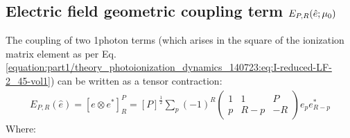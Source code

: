 \documentclass[letterpaper,table,10pt,english]{jupyterBook}
\begin{document}
\subsection{Electric field geometric coupling term \protect\({E_{P,R}(\hat{e};\mu_{0})}\protect\)}
\label{\detokenize{part1/theory_tensor_formalism_160723:electric-field-geometric-coupling-term-e-p-r-hat-e-mu-0}}\label{\detokenize{part1/theory_tensor_formalism_160723:sec-theory-epr-term}}
\sphinxAtStartPar
The coupling of two 1\sphinxhyphen{}photon terms (which arises in the square of the ionization matrix element as per Eq. \eqref{equation:part1/theory_photoionization_dynamics_140723:eq:I-reduced-LF-2_45-vol1}) can be written as a tensor contraction:
\begin{equation}\label{equation:part1/theory_tensor_formalism_160723:eq:EPR-defn-1}
\begin{split}
E_{P,R}(\hat{e})=[e\otimes e^{*}]_{R}^{P}=[P]^{\frac{1}{2}}\sum_{p}(-1)^{R}\left(\begin{array}{ccc}
1 & 1 & P\\
p & R-p & -R
\end{array}\right)e_{p}e_{R-p}^{*}
\end{split}
\end{equation}
\sphinxAtStartPar
Where:
\end{document}
